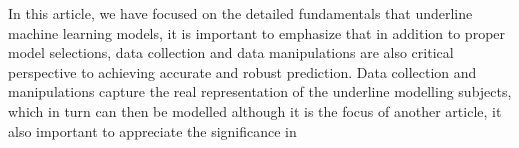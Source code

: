 
\par
In this article, we have focused on the detailed fundamentals that underline machine learning models, it is important to emphasize that in addition to proper model selections, data collection and data manipulations are also critical perspective to achieving accurate and robust prediction. Data collection and manipulations capture the real representation of the underline modelling subjects, which in turn can then be modelled  although it is the focus of another article, it also important to appreciate the significance in 
\par 
